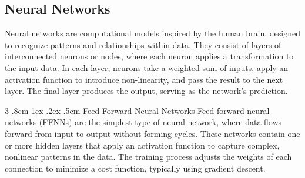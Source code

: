 \documentclass[%
reprint,
amsmath,amssymb,
aps,
]{revtex4-2}
\makeatletter
\renewcommand{\subsubsection}{%
	\@startsection
	{subsubsection}%
	{3}%
	{\z@}%
	{.8cm \@plus1ex \@minus .2ex}%
	{.5cm}%
	{\normalfont\small\centering}%
}
\makeatother
\begin{document}
\subsection{Neural Networks}
Neural networks are computational models inspired by the human brain, designed to recognize patterns and relationships within data. They consist of layers of interconnected neurons or nodes, where each neuron applies a transformation to the input data. In each layer, neurons take a weighted sum of inputs, apply an activation function to introduce non-linearity, and pass the result to the next layer. The final layer produces the output, serving as the network’s prediction.

\subsubsection{Feed Forward Neural Networks}
Feed-forward neural networks (FFNNs) are the simplest type of neural network, where data flows forward from input to output without forming cycles. These networks contain one or more hidden layers that apply an activation function to capture complex, nonlinear patterns in the data. The training process adjusts the weights of each connection to minimize a cost function, typically using gradient descent.
\end{document}
